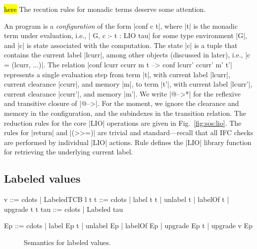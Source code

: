 \hl{here}
The recution rules for monadic terms deserve some attention.

An \lio{} program is a \emph{configuration} of the form |conf c t|,
where |t| is the monadic term under evaluation, i.e., | G, c :- t :
LIO tau| for some type environment |G|, and |c| is state associated
with the computation.
%
The state |c| is a tuple that contains the current label |lcurr|,
among other objects (discussed in later), i.e., |c = (lcurr, ...)|.
%
The relation |conf lcurr ccurr m t  -->  conf lcurr' ccurr' m' t'|
represents a single evaluation step from term |t|, with current label
|lcurr|, current clearance |ccurr|, and memory |m|, to term |t'|, with
current label |lcurr'|, current clearance |ccurr'|, and memory |m'|.
%
We write |@-->*| for the reflexive and transitive closure of |@-->|.
%
For the moment, we ignore the clearance and memory in the
configuration, and the subindexes in the transition relation.
%
The reduction rules for the core |LIO| operations are given in
Fig.~\ref{fig:sos:lio}.
%
The rules for |return| and |(>>=)| are trivial and standard---recall
that all IFC checks are performed by individual |LIO| actions.
%
Rule  defines the |LIO| library function for
retrieving the underlying current label. 



\subsection{Labeled values}

\begin{code}
v    ::= cdots  | LabeledTCB l t
t    ::= cdots  | label t t | unlabel t | labelOf t
                | upgrade t t
tau  ::= cdots  | Labeled tau

Ep   ::= cdots  | label Ep t | unlabel Ep | labelOf Ep
                | upgrade Ep t | upgrade v Ep
\end{code}

\begin{figure}[t] %
\small
{}
\caption{Semantics for labeled values\label{fig:sos:labeled}.}
\end{figure}

